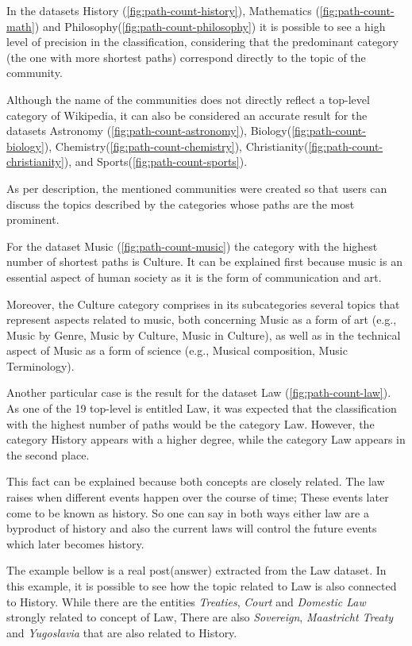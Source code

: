 

In the datasets History (\ref{fig:path-count-history}), Mathematics (\ref{fig:path-count-math}) and Philosophy(\ref{fig:path-count-philosophy}) it is possible to see a high level of precision in the classification, considering that the predominant category (the one with more shortest paths) correspond directly to the topic of the community. 

Although the name of the communities does not directly reflect a top-level category of Wikipedia, it can also be considered an accurate result for the datasets Astronomy (\ref{fig:path-count-astronomy}), Biology(\ref{fig:path-count-biology}), Chemistry(\ref{fig:path-count-chemistry}), Christianity(\ref{fig:path-count-christianity}), and Sports(\ref{fig:path-count-sports}).

As per description, the mentioned communities were created so that users can discuss the topics described by the categories whose paths are the most prominent.

For the dataset Music (\ref{fig:path-count-music}) the category with the highest number of shortest paths is Culture. It can be explained first because music is an essential aspect of human society as it is the form of communication and art.

Moreover, the Culture category comprises in its subcategories several topics that represent aspects related to music, both concerning Music as a form of art (e.g., Music by Genre, Music by Culture, Music in Culture), as well as in the technical aspect of Music as a form of science (e.g., Musical composition, Music Terminology).

Another particular case is the result for the dataset Law (\ref{fig:path-count-law}). As one of the 19 top-level is entitled Law, it was expected that the classification with the highest number of paths would be the category Law. However, the category History appears with a higher degree, while the category Law appears in the second place.

This fact can be explained because both concepts are closely related. The law raises when different events happen over the course of time; These events later come to be known as history. So one can say in both ways either law are a byproduct of history and also the current laws will control the future events which later becomes history.

The example bellow is a real post(answer) extracted from the Law dataset. In this example, it is possible to see how the topic related to Law is also connected to History. While there are the entities \textit{Treaties}, \textit{Court} and \textit{Domestic Law} strongly related to concept of Law, There are also \textit{Sovereign}, \textit{Maastricht Treaty} and \textit{Yugoslavia} that are also related to History. 

